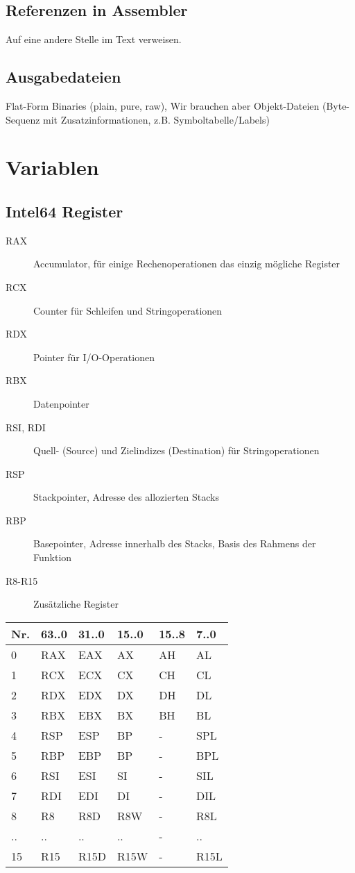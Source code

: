 \begin{multicols*}{4}
    \subsection{Referenzen in Assembler}
    Auf eine andere Stelle im Text verweisen.

    \subsection{Ausgabedateien}
    Flat-Form Binaries (plain, pure, raw), Wir brauchen aber Objekt-Dateien (Byte-Sequenz mit Zusatzinformationen, z.B. Symboltabelle/Labels)

    \section{Variablen}
    \subsection{Intel64 Register}
    \begin{description}
        \item[RAX] Accumulator, für einige Rechenoperationen das einzig mögliche Register
        \item[RCX] Counter für Schleifen und Stringoperationen
        \item[RDX] Pointer für I/O-Operationen
        \item[RBX] Datenpointer
        \item[RSI, RDI] Quell- (Source) und Zielindizes (Destination) für Stringoperationen
        \item[RSP] Stackpointer, Adresse des allozierten Stacks
        \item[RBP] Basepointer, Adresse innerhalb des Stacks, Basis des Rahmens der Funktion
        \item[R8-R15] Zusätzliche Register
    \end{description}

    \begin{tabular}{llllll}
      Nr. & 63..0 & 31..0 & 15..0 & 15..8 & 7..0\\
      \hline
      0 & RAX & EAX & AX & AH & AL\\
      1 & RCX & ECX & CX & CH & CL\\
      2 & RDX & EDX & DX & DH & DL\\
      3 & RBX & EBX & BX & BH & BL\\
      \hline
      4 & RSP & ESP & BP & - & SPL\\
      5 & RBP & EBP & BP & - & BPL\\
      6 & RSI & ESI & SI & - & SIL\\
      7 & RDI & EDI & DI & - & DIL\\
      \hline
      8 & R8 & R8D & R8W & - & R8L\\
      .. & .. & .. & .. & - & ..\\
      15 & R15 & R15D & R15W & - & R15L
    \end{tabular}


\end{multicols*}
